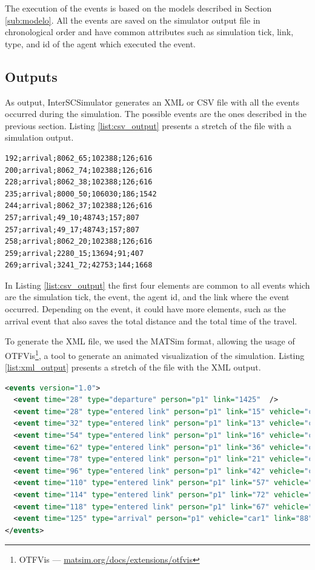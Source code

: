 The execution of the events is based on the models described in Section \ref{sub:modelo}. All the events are saved on the simulator output file in chronological order and have common attributes such as simulation tick, link, type, and id of the agent which executed the event.

\subsection{Outputs}
\label{sub:saida}

As output, InterSCSimulator generates an XML or CSV file with all the events occurred during the simulation. The possible events are the ones described in the previous section. Listing \ref{list:csv_output} presents a stretch of the file with a simulation output.

\lstset{language=XML}
\begin{lstlisting}[caption=CSV output file, label=list:csv_output]
192;arrival;8062_65;102388;126;616
200;arrival;8062_74;102388;126;616
228;arrival;8062_38;102388;126;616
235;arrival;8000_50;106030;186;1542
244;arrival;8062_37;102388;126;616
257;arrival;49_10;48743;157;807
257;arrival;49_17;48743;157;807
258;arrival;8062_20;102388;126;616
259;arrival;2280_15;13694;91;407
269;arrival;3241_72;42753;144;1668
\end{lstlisting}

In Listing \ref{list:csv_output} the first four elements are common to all events which are the simulation tick, the event, the agent id, and the link where the event occurred. Depending on the event, it could have more elements, such as the arrival event that also saves the total distance and the total time of the travel.

To generate the XML file, we used the MATSim format, allowing the usage of OTFVis\footnote{OTFVis --- \url{matsim.org/docs/extensions/otfvis}}, a tool to generate an animated visualization of the simulation. Listing \ref{list:xml_output} presents a stretch of the file with the XML output.

\lstset{language=XML}
\begin{lstlisting}[language=xml, caption=XML output file, label=list:xml_output]
<events version="1.0">
  <event time="28" type="departure" person="p1" link="1425"  />
  <event time="28" type="entered link" person="p1" link="15" vehicle="car1" />
  <event time="32" type="entered link" person="p1" link="13" vehicle="car1" />
  <event time="54" type="entered link" person="p1" link="16" vehicle="car1" />
  <event time="62" type="entered link" person="p1" link="36" vehicle="car1" />
  <event time="78" type="entered link" person="p1" link="21" vehicle="car1" />
  <event time="96" type="entered link" person="p1" link="42" vehicle="car1" />
  <event time="110" type="entered link" person="p1" link="57" vehicle="car1" />
  <event time="114" type="entered link" person="p1" link="72" vehicle="car1" />
  <event time="118" type="entered link" person="p1" link="67" vehicle="car1" />
  <event time="125" type="arrival" person="p1" vehicle="car1" link="88" trip_time="191" distance="2634" />
</events>
\end{lstlisting}


